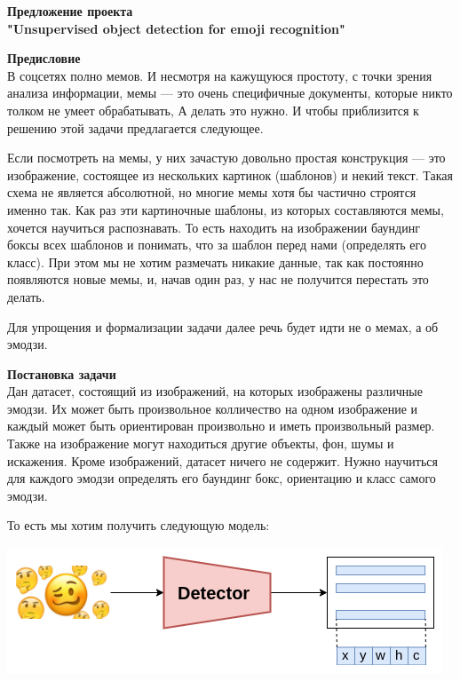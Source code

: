 \documentclass[12pt]{article}
\begin{document}
	\begin{center}
		\textbf{Предложение проекта}\\
		\textbf{"Unsupervised object detection for emoji recognition"}\\
	\end{center}
	
	\textbf{Предисловие}\\
	В соцсетях полно мемов. И несмотря на кажущуюся простоту, с точки зрения анализа информации, мемы --- это очень специфичные документы, которые никто толком не умеет обрабатывать, А делать это нужно. И чтобы приблизится к решению этой задачи предлагается следующее.
	
	Если посмотреть на мемы, у них зачастую довольно простая конструкция --- это изображение, состоящее из нескольких картинок (шаблонов) и некий текст. Такая схема не является абсолютной, но многие мемы хотя бы частично строятся именно так. Как раз эти картиночные шаблоны, из которых составляются мемы, хочется научиться распознавать. То есть находить на изображении баундинг боксы всех шаблонов и понимать, что за шаблон перед нами (определять его класс). При этом мы не хотим размечать никакие данные, так как постоянно появляются новые мемы, и, начав один раз, у нас не получится перестать это делать. 
	
	Для упрощения и формализации задачи далее речь будет идти не о мемах, а об эмодзи.
	
	\textbf{Постановка задачи}\\
	Дан датасет, состоящий из изображений, на которых изображены различные эмодзи. Их может быть произвольное колличество на одном изображение и каждый может быть ориентирован произвольно и иметь произвольный размер. Также на изображение могут находиться другие объекты, фон, шумы и искажения. Кроме изображений, датасет ничего не содержит.
	Нужно научиться для каждого эмодзи определять его баундинг бокс, ориентацию и класс самого эмодзи.
	
	То есть мы хотим получить следующую модель:
	
	\centerline{\includegraphics[scale=1.0]{images/model_architecture_target.png}}
	
\end{document}
